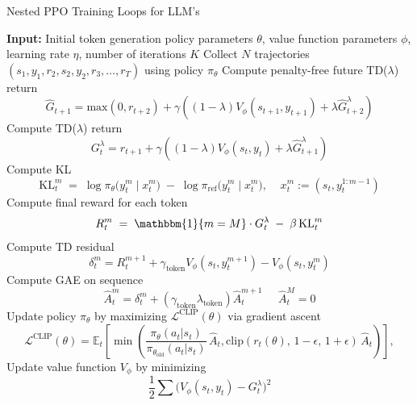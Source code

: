 \documentclass[11pt,a4paper]{article}
\begin{document}
\begin{algorithm*}
\caption{Nested PPO Training Loops for LLM's}
\begin{algorithmic}[1]
\State \textbf{Input:} Initial token generation policy parameters $\theta$, value function parameters $\phi$, learning rate $\eta$, number of iterations $K$
    \State Collect $N$ trajectories $(s_1, y_1, r_2, s_2, y_2, r_3, \dots, r_T)$ using policy $\pi_\theta$
        \State Compute penalty-free future TD($\lambda$) return
        \[\hat{G}_{t+1} = \mathrm{max}(0, r_{t+2}) + \gamma((1-\lambda)V_\phi(s_{t+1}, y_{t+1}) + \lambda \hat{G}_{t+2}^\lambda)\]
        \State Compute TD($\lambda$) return
        \[G_t^\lambda = r_{t+1} + \gamma((1-\lambda)V_\phi(s_t, y_t) + \lambda \hat{G}_{t+1}^\lambda)\]
            \State Compute KL
            \[\mathrm{KL}_t^m \;=\; \log \pi_\theta\bigl(y^m_t \mid x^m_t\bigr) \;-\; \log \pi_{\text{ref}}\bigl(y^m_t \mid x^m_t\bigr),\;\;\;\;x^m_t := (s_t, y^{1:m-1}_t)\]
            \State Compute final reward for each token
            \[R^m_t \;=\; \mathbbm{1}\{m=M\} \cdot G_t^\lambda \;-\; \beta \,\mathrm{KL}^m_t\]
            \State Compute TD residual
            \[
            \delta^m_t = R^{m+1}_{t} + \gamma_{\text{token}}V_\phi(s_{t}, y_{t}^{m+1}) - V_\phi(s_t, y_t^m)
            \]
            \State Compute GAE on sequence
            \[
                \hat{A}^m_t = \delta^m_t + (\gamma_{\text{token}}\lambda_{\text{token}})\hat{A}_t^{m+1}\;\;\;\;\;\hat{A}_t^M = 0
            \]
        \EndFor
    \EndFor
    \State Update policy $\pi_\theta$ by maximizing $\mathcal{L}^{\mathrm{CLIP}}(\theta)$ via gradient ascent
    \[
    \mathcal{L}^{\mathrm{CLIP}}(\theta) = \mathbb{E}_t \left[ 
\min\left(\frac{\pi_\theta(a_t|s_t)}{\pi_{\theta_{\text{old}}}(a_t|s_t)}\,\hat{A}_t, \mathrm{clip}(r_t(\theta),\, 1{-}\epsilon,\, 1{+}\epsilon)\,\hat{A}_t \right) \right],
    \]
    \State Update value function $V_\phi$ by minimizing 
    \[
    \frac{1}{2}\sum\big(V_\phi(s_t, y_t) - G_t^{\lambda}\big)^2
    \]
\EndFor
\end{algorithmic}
\label{alg:ppo}
\end{algorithm*}
\end{document}
